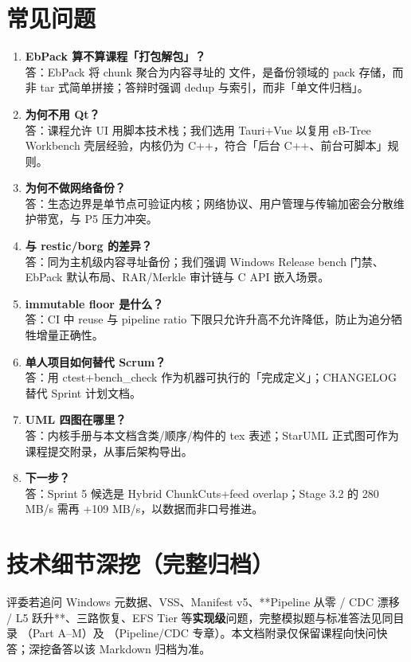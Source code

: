 \documentclass[11pt,a4paper,fontset=none]{ctexart}
\begin{document}
\section{常见问题}
\begin{enumerate}
  \item \textbf{EbPack 算不算课程「打包解包」？}\\
  答：EbPack 将 chunk 聚合为内容寻址的  文件，是备份领域的 pack 存储，而非 tar 式简单拼接；答辩时强调 dedup 与索引，而非「单文件归档」。

  \item \textbf{为何不用 Qt？}\\
  答：课程允许 UI 用脚本技术栈；我们选用 Tauri+Vue 以复用 eB-Tree Workbench 壳层经验，内核仍为 C++，符合「后台 C++、前台可脚本」规则。

  \item \textbf{为何不做网络备份？}\\
  答：生态边界是单节点可验证内核；网络协议、用户管理与传输加密会分散维护带宽，与 P5 压力冲突。

  \item \textbf{与 restic/borg 的差异？}\\
  答：同为主机级内容寻址备份；我们强调 Windows Release bench 门禁、EbPack 默认布局、RAR/Merkle 审计链与 C API 嵌入场景。

  \item \textbf{immutable floor 是什么？}\\
  答：CI 中 reuse 与 pipeline ratio 下限只允许升高不允许降低，防止为追分牺牲增量正确性。

  \item \textbf{单人项目如何替代 Scrum？}\\
  答：用 ctest+bench\_check 作为机器可执行的「完成定义」；CHANGELOG 替代 Sprint 计划文档。

  \item \textbf{UML 四图在哪里？}\\
  答：内核手册与本文档含类/顺序/构件的 tex 表述；StarUML 正式图可作为课程提交附录，从事后架构导出。

  \item \textbf{下一步？}\\
  答：Sprint 5 候选是 Hybrid ChunkCuts+feed overlap；Stage 3.2 的 280 MB/s 需再 +109 MB/s，以数据而非口号推进。
\end{enumerate}

\section{技术细节深挖（完整归档）}
\begin{say}
评委若追问 Windows 元数据、VSS、Manifest v5、**Pipeline 从零 / CDC 漂移 / L5 跃升**、三路恢复、EFS Tier 等\textbf{实现级}问题，完整模拟题与标准答法见同目录 （Part A--M）及 （Pipeline/CDC 专章）。本文档附录仅保留课程向快问快答；深挖备答以该 Markdown 归档为准。
\end{say}
\end{document}
